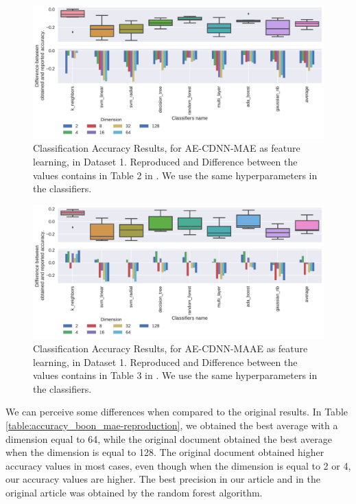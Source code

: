 \begin{figure}[!ht]
  \centering
  \includegraphics[width=0.8\linewidth]{figure/table_2.pdf}
  \caption{Classification Accuracy Results, for AE-CDNN-MAE as feature learning, in Dataset 1. Reproduced and Difference between the values contains in Table 2 in \cite{WenZha:2018}. We use the same hyperparameters in the classifiers.}
\label{fig:acc-AE-CDNN-MAE-d1}
\end{figure}


\begin{figure}[!ht]
  \centering
  \includegraphics[width=0.8\linewidth]{figure/table_3.pdf}
  \caption{Classification Accuracy Results, for AE-CDNN-MAAE as feature learning, in Dataset 1. Reproduced and Difference between the values contains in Table 3 in \cite{WenZha:2018}. We use the same hyperparameters in the classifiers.}
\label{fig:acc-AE-CDNN-MAAE-d1}
\end{figure}

We can perceive some differences when compared to the original results. In Table \ref{table:accuracy_boon_mae-reproduction}, we obtained the best average with a dimension equal to 64, while the original document obtained the best average when the dimension is equal to 128. The original document obtained higher accuracy values in most cases, even though when the dimension is equal to 2 or 4, our accuracy values are higher. The best precision in our article and in the original article was obtained by the random forest algorithm.




